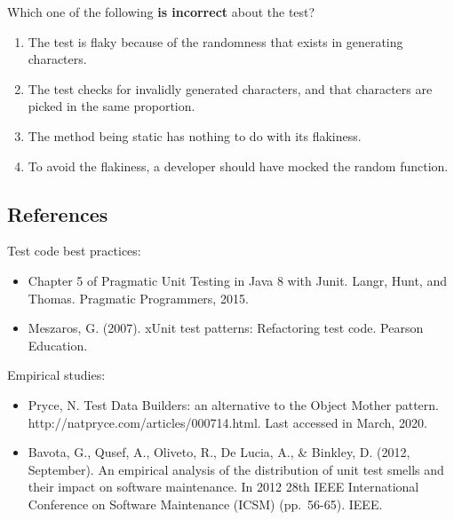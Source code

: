 \begin{Shaded}
\begin{Highlighting}[]
               \NormalTok{: \{}\NormalTok{(}\NormalTok{);\}}
\NormalTok{           \}}
\NormalTok{       \}}
\NormalTok{    \}}
    \NormalTok{(}\NormalTok{,}
        \NormalTok{);}
\NormalTok{\}}
\end{Highlighting}
\end{Shaded}

Which one of the following \textbf{is incorrect} about the test?

\begin{enumerate}
\def\labelenumi{\arabic{enumi}.}
\tightlist
\item
  The test is flaky because of the randomness that exists in generating
  characters.
\item
  The test checks for invalidly generated characters, and that
  characters are picked in the same proportion.
\item
  The method being static has nothing to do with its flakiness.
\item
  To avoid the flakiness, a developer should have mocked the random
  function.
\end{enumerate}

\hypertarget{references}{%
\subsection{References}\label{references}}

Test code best practices:

\begin{itemize}
\tightlist
\item
  Chapter 5 of Pragmatic Unit Testing in Java 8 with Junit. Langr, Hunt,
  and Thomas. Pragmatic Programmers, 2015.
\item
  Meszaros, G. (2007). xUnit test patterns: Refactoring test code.
  Pearson Education.
\end{itemize}

Empirical studies:

\begin{itemize}
\tightlist
\item
  Pryce, N. Test Data Builders: an alternative to the Object Mother
  pattern. http://natpryce.com/articles/000714.html. Last accessed in
  March, 2020.
\item
  Bavota, G., Qusef, A., Oliveto, R., De Lucia, A., \& Binkley, D.
  (2012, September). An empirical analysis of the distribution of unit
  test smells and their impact on software maintenance. In 2012 28th
  IEEE International Conference on Software Maintenance (ICSM)
  (pp.~56-65). IEEE.
\end{itemize}

